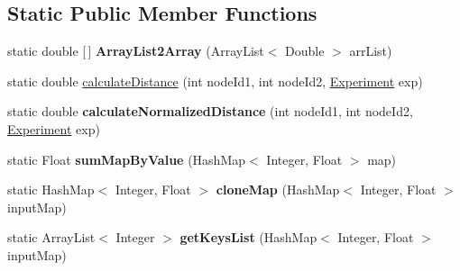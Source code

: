 \subsection*{Static Public Member Functions}
\begin{DoxyCompactItemize}
\item 
\mbox{\label{classedu_1_1uiuc_1_1viz_1_1algorithms_1_1_traversal_a52a93aecb77c5072945a4db7b994ebfe}} 
static double \mbox{[}$\,$\mbox{]} {\bfseries Array\+List2\+Array} (Array\+List$<$ Double $>$ arr\+List)
\item 
static double \mbox{\hyperlink{classedu_1_1uiuc_1_1viz_1_1algorithms_1_1_traversal_ab7a9795c9eafec00f2ff2ba5a099deeb}{calculate\+Distance}} (int node\+Id1, int node\+Id2, \mbox{\hyperlink{classedu_1_1uiuc_1_1viz_1_1algorithms_1_1_experiment}{Experiment}} exp)
\item 
\mbox{\label{classedu_1_1uiuc_1_1viz_1_1algorithms_1_1_traversal_a31aa6eacabe47303fa9ed47f32fefdcd}} 
static double {\bfseries calculate\+Normalized\+Distance} (int node\+Id1, int node\+Id2, \mbox{\hyperlink{classedu_1_1uiuc_1_1viz_1_1algorithms_1_1_experiment}{Experiment}} exp)
\item 
\mbox{\label{classedu_1_1uiuc_1_1viz_1_1algorithms_1_1_traversal_ae67f7f960d97482195cccf03eea3a532}} 
static Float {\bfseries sum\+Map\+By\+Value} (Hash\+Map$<$ Integer, Float $>$ map)
\item 
\mbox{\label{classedu_1_1uiuc_1_1viz_1_1algorithms_1_1_traversal_ae3174127bec82446a06fdf6c50c8afa2}} 
static Hash\+Map$<$ Integer, Float $>$ {\bfseries clone\+Map} (Hash\+Map$<$ Integer, Float $>$ input\+Map)
\item 
\mbox{\label{classedu_1_1uiuc_1_1viz_1_1algorithms_1_1_traversal_a8c8993fd3738a62e63ec7912f124810c}} 
static Array\+List$<$ Integer $>$ {\bfseries get\+Keys\+List} (Hash\+Map$<$ Integer, Float $>$ input\+Map)
\item 
\mbox{\label{classedu_1_1uiuc_1_1viz_1_1algorithms_1_1_traversal_ac14836ba40ab6ba1d6984c2f6682376f}} 

\end{DoxyCompactItemize}
